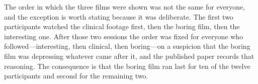 %
%

The order in which the three films were shown was not the same for everyone, and the exception
is worth stating because it was deliberate. The first two participants watched the clinical
footage first, then the boring film, then the interesting one. After those two sessions the
order was fixed for everyone who followed---interesting, then clinical, then boring---on a
suspicion that the boring film was depressing whatever came after it, and the published paper
records that reasoning. The consequence is that the boring film ran last for ten of the twelve
participants and second for the remaining two.

